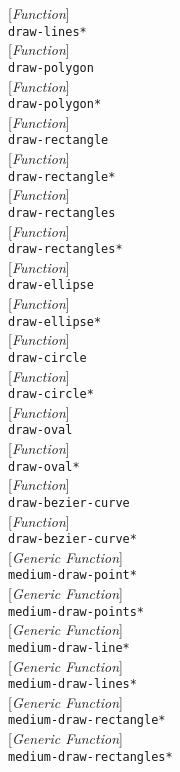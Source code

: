 \documentclass[10pt]{book}
\newenvironment{defother}[2]{[\textit{#1}]\\\texttt{#2}}{\\}
\newenvironment{defun}[1]{\begin{defother}{Function}{#1}}{\end{defother}}
\newenvironment{defgeneric}[1]{\begin{defother}{Generic Function}{#1}}{\end{defother}}
\begin{document}
\begin{defun}{draw-lines*}\end{defun}
\begin{defun}{draw-polygon}\end{defun}
\begin{defun}{draw-polygon*}\end{defun}
\begin{defun}{draw-rectangle}\end{defun}
\begin{defun}{draw-rectangle*}\end{defun}
\begin{defun}{draw-rectangles}\end{defun}
\begin{defun}{draw-rectangles*}\end{defun}
\begin{defun}{draw-ellipse}\end{defun}
\begin{defun}{draw-ellipse*}\end{defun}
\begin{defun}{draw-circle}\end{defun}
\begin{defun}{draw-circle*}\end{defun}
\begin{defun}{draw-oval}\end{defun}
\begin{defun}{draw-oval*}\end{defun}
\begin{defun}{draw-bezier-curve}\end{defun}
\begin{defun}{draw-bezier-curve*}\end{defun}
\begin{defgeneric}{medium-draw-point*}\end{defgeneric}
\begin{defgeneric}{medium-draw-points*}\end{defgeneric}
\begin{defgeneric}{medium-draw-line*}\end{defgeneric}
\begin{defgeneric}{medium-draw-lines*}\end{defgeneric}
\begin{defgeneric}{medium-draw-rectangle*}\end{defgeneric}
\begin{defgeneric}{medium-draw-rectangles*}\end{defgeneric}
\end{document}
